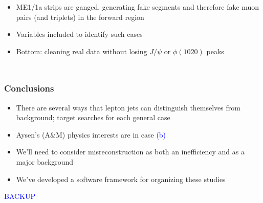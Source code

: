 \documentclass[compress]{beamer}
\begin{document}
\begin{frame}
\begin{columns}
\begin{itemize}
\item ME1/1a strips are ganged, generating fake segments and therefore
  fake muon pairs (and triplets) in the forward region

\item Variables included to identify such cases

\item Bottom: cleaning real data without losing $J/\psi$ or
  $\phi(1020)$ peaks
\end{itemize}
\end{columns}
\end{frame}


\begin{frame}
\frametitle{Conclusions}

\begin{itemize}\setlength{\itemsep}{0.5 cm}
\item There are several ways that lepton jets can distinguish themselves from background; target searches for each general case

\item Aysen's (A\&M) physics interests are in case \textcolor{blue}{(b)}

\item We'll need to consider misreconstruction as both an inefficiency and as a major background

\item We've developed a software framework for organizing these studies
\end{itemize}

\label{numpages}
\end{frame}

\begin{frame}
\begin{center}
\textcolor{blue}{\Large BACKUP}
\end{center}
\end{frame}
\end{document}
